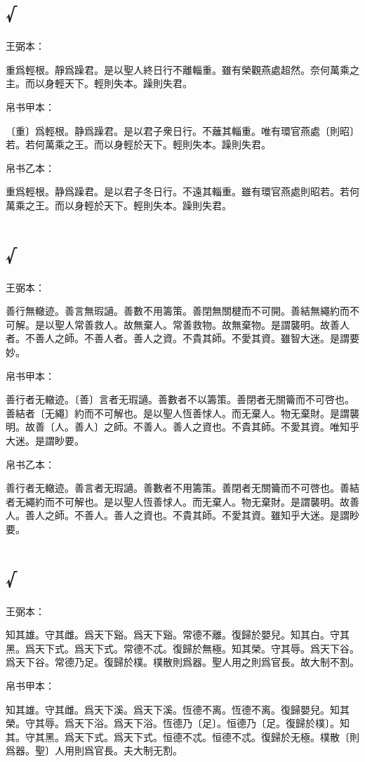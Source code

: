 \documentclass[a5paper]{ctexbook}
\begin{document}
    \chapter{√}
    王弼本：

    重爲輕根。靜爲躁君。是以聖人終日行不離輜重。雖有榮觀燕處超然。奈何萬乘之主。而以身輕天下。輕則失本。躁則失君。

    
    帛书甲本：

    〔重〕爲輕根。静爲躁君。是以君子衆日行。不蘺其輜重。唯有環官燕處〔則昭〕若。若何萬乘之王。而以身輕於天下。輕則失本。躁則失君。

    帛书乙本：

    重爲輕根。静爲躁君。是以君子冬日行。不遠其輜重。雖有環官燕處則昭若。若何萬乘之王。而以身輕於天下。輕則失本。躁則失君。

    \chapter{√}
    王弼本：

    善行無轍迹。善言無瑕讁。善數不用籌策。善閉無關楗而不可開。善結無繩約而不可解。是以聖人常善救人。故無棄人。常善救物。故無棄物。是謂襲明。故善人者。不善人之師。不善人者。善人之資。不貴其師。不愛其資。雖智大迷。是謂要妙。

    
    帛书甲本：

    善行者无轍迹。〔善〕言者无瑕讁。善數者不以籌策。善閉者无關籥而不可啓也。善結者〔无繩〕約而不可解也。是以聖人恆善㤹人。而无棄人。物无棄財。是謂襲明。故善〔人。善人〕之師。不善人。善人之資也。不貴其師。不愛其資。唯知乎大迷。是謂眇要。

    帛书乙本：

    善行者无轍迹。善言者无瑕讁。善數者不用籌策。善閉者无關籥而不可啓也。善結者无繩約而不可解也。是以聖人恆善㤹人。而无棄人。物无棄財。是謂襲明。故善人。善人之師。不善人。善人之資也。不貴其師。不愛其資。雖知乎大迷。是謂眇要。

    \chapter{√}
    王弼本：

    知其雄。守其雌。爲天下谿。爲天下谿。常德不離。復歸於嬰兒。知其白。守其黑。爲天下式。爲天下式。常德不忒。復歸於無極。知其榮。守其辱。爲天下谷。爲天下谷。常德乃足。復歸於樸。樸散則爲器。聖人用之則爲官長。故大制不割。

    
    帛书甲本：

    知其雄。守其雌。爲天下溪。爲天下溪。恆德不离。恆德不离。復歸嬰兒。知其榮。守其辱。爲天下浴。爲天下浴。恆德乃〔足〕。恒德乃〔足。復歸於樸〕。知其。守其黑。爲天下式。爲天下式。恒德不忒。恒德不忒。復歸於无極。樸散〔則爲器。聖〕人用則爲官長。夫大制无割。
\end{document}
